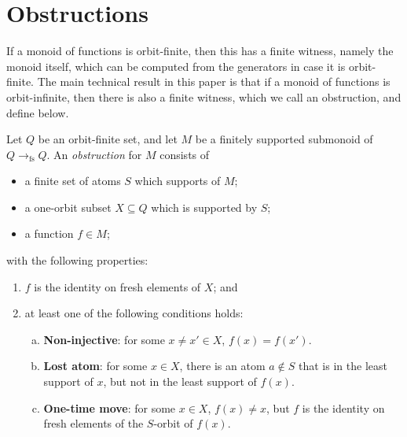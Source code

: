 \section{Obstructions}
\label{sec:obstructions}
If a monoid of functions is orbit-finite, then this has a finite witness, namely the  monoid itself, which can be computed from the generators in case it is orbit-finite. 
The main technical result in this paper is that if a monoid of functions is orbit-infinite, then there is also a finite witness, which we call an obstruction, and define below.

\newcommand{\fsfun}{\underset {\text{fs}} \longrightarrow}
\newcommand{\smallfsfun}{\to_{\text{fs}}}
\begin{definition}[Obstruction]
    Let $Q$ be an orbit-finite set, and let $M$ be a finitely supported  submonoid of $Q \smallfsfun Q$.
    An \emph{obstruction} for $M$ consists of 
    \begin{itemize}
        \item a finite set of atoms $S$ which supports of $M$;
        \item a one-orbit subset $X \subseteq Q$ which is supported by $S$;
        \item a function $f \in M$;
    \end{itemize}
    with the following properties:
    \begin{enumerate}
        \item $f$ is the identity on fresh elements  of  $X$; and 
        \item at least one of the following conditions holds: 
        \begin{enumerate}[(a)]
            \item \label{item:merge-obstruction}
             \textbf{Non-injective}: for some $x \neq x' \in X$, $f(x) = f(x')$.
            \item \label{item:lost-atom-obstruction}
            \textbf{Lost atom}: for some $x \in X$, there is an atom $a \notin S$ that is in the least support of $x$, but not in the least support of $f(x)$.
            \item \label{item:one-time-move-obstruction} \textbf{One-time move}: for some $x \in X$, $f(x) \neq x$, but $f$ is the identity on fresh elements of the $S$-orbit of $f(x)$.
        \end{enumerate}
    \end{enumerate}
\end{definition}



